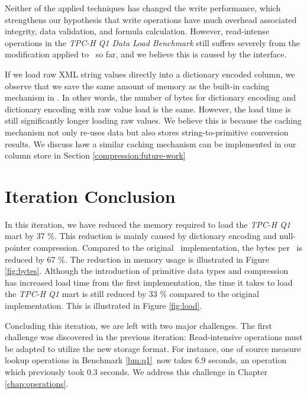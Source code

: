 Neither of the applied techniques has changed the write performance, which strengthens our hypothesis that write operations have much overhead associated integrity, data validation, and formula calculation. However, read-intense operations in the \textit{TPC-H Q1 Data Load Benchmark} still suffers severely from the modification applied to \gap~so far, and we believe this is caused by the  interface.

If we load raw XML string values directly into a dictionary encoded column, we observe that we save the same amount of memory as the built-in caching mechanism in \gap. In other words, the number of bytes for dictionary encoding and dictionary encoding with raw value load is the same. However, the load time is still significantly longer loading raw values. We believe this is because the caching mechanism not only re-uses data but also stores string-to-primitive conversion results. We discuss how a similar caching mechanism can be implemented in our column store in Section \ref{compression:future-work}

\section{Iteration Conclusion}
\label{sec:Iteration Conclusion}
In this iteration, we have reduced the memory required to load the \textit{TPC-H Q1} mart by 37 \%. This reduction is mainly caused by dictionary encoding and null-pointer compression. Compared to the original \gap~implementation, the bytes per \lineitem~is reduced by 67 \%. The reduction in memory usage is illustrated in Figure \ref{fig:bytes}. Although the introduction of primitive data types and compression has increased load time from the first  implementation, the time it takes to load the \textit{TPC-H Q1} mart is still reduced by 33 \% compared to the original implementation. This is illustrated in Figure \ref{fig:load}.

Concluding this iteration, we are left with two major challenges. The first challenge was discovered in the previous iteration: Read-intensive operations must be adapted to utilize the new storage format. For instance, one of source measure lookup operations in Benchmark \ref{bm:q1}~now takes 6.9 seconds, an operation which previously took 0.3 seconds. We address this challenge in Chapter \ref{chap:operations}.

